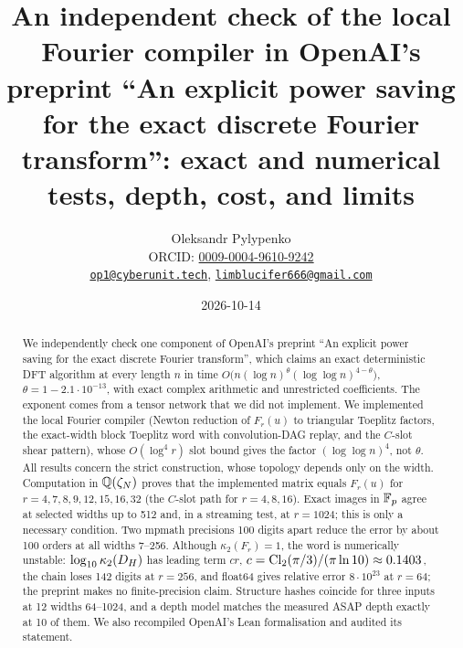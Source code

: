 \documentclass[11pt]{article}
\theoremstyle{plain}
\begin{document}

\title{An independent check of the local Fourier compiler in OpenAI's preprint
``An explicit power saving for the exact discrete Fourier transform'':
exact and numerical tests, depth, cost, and limits}
\author{Oleksandr Pylypenko\\[2pt]\small ORCID: \href{https://orcid.org/0009-0004-9610-9242}{0009-0004-9610-9242}\\ \href{mailto:op1@cyberunit.tech}{\texttt{op1@cyberunit.tech}}, \href{mailto:limblucifer666@gmail.com}{\texttt{limblucifer666@gmail.com}}}
\date{2026-10-14}
\maketitle

\begin{abstract}
\noindent
We independently check one component of OpenAI's preprint ``An explicit power saving for the exact discrete Fourier transform'', which claims an exact deterministic DFT algorithm at every length $n$ in time $O\bigl(n(\log n)^{\theta}(\log\log n)^{4-\theta}\bigr)$, $\theta=1-2.1\cdot10^{-13}$, with exact complex arithmetic and unrestricted coefficients. The exponent comes from a tensor network that we did not implement. We implemented the local Fourier compiler (Newton reduction of $F_r(u)$ to triangular Toeplitz factors, the exact-width block Toeplitz word with convolution-DAG replay, and the $C$-slot shear pattern), whose $O(\log^4 r)$ slot bound gives the factor $(\log\log n)^4$, not $\theta$. All results concern the strict construction, whose topology depends only on the width. Computation in $\mathbb{Q}(\zeta_N)$ proves that the implemented matrix equals $F_r(u)$ for $r=4,7,8,9,12,15,16,32$ (the $C$-slot path for $r=4,8,16$). Exact images in $\mathbb{F}_p$ agree at selected widths up to 512 and, in a streaming test, at $r=1024$; this is only a necessary condition. Two mpmath precisions 100 digits apart reduce the error by about 100 orders at all widths 7--256. Although $\kappa_2(F_r)=1$, the word is numerically unstable: $\log_{10}\kappa_2(D_H)$ has leading term $cr$, $c=\operatorname{Cl}_2(\pi/3)/(\pi\ln10)\approx0.1403$, the chain loses 142 digits at $r=256$, and float64 gives relative error $8\cdot10^{23}$ at $r=64$; the preprint makes no finite-precision claim. Structure hashes coincide for three inputs at 12 widths 64--1024, and a depth model matches the measured ASAP depth exactly at 10 of them. We also recompiled OpenAI's Lean formalisation and audited its statement.
\end{abstract}
\end{document}
